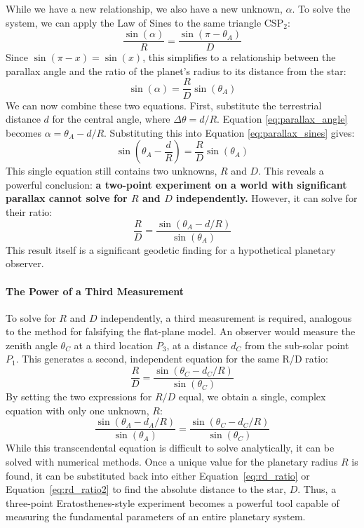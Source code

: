 \documentclass[11pt]{article}
\begin{document}
While we have a new relationship, we also have a new unknown, $\alpha$. To solve the system, we can apply the Law of Sines to the same triangle CSP$_2$:
\[
\frac{\sin(\alpha)}{R} = \frac{\sin(\pi - \theta_A)}{D}
\]
Since $\sin(\pi - x) = \sin(x)$, this simplifies to a relationship between the parallax angle and the ratio of the planet's radius to its distance from the star:
\begin{equation}
\sin(\alpha) = \frac{R}{D} \sin(\theta_A)
\label{eq:parallax_sines}
\end{equation}
We can now combine these two equations. First, substitute the terrestrial distance $d$ for the central angle, where $\Delta\theta = d/R$. Equation \ref{eq:parallax_angle} becomes $\alpha = \theta_A - d/R$. Substituting this into Equation \ref{eq:parallax_sines} gives:
\[
\sin\left(\theta_A - \frac{d}{R}\right) = \frac{R}{D} \sin(\theta_A)
\]
This single equation still contains two unknowns, $R$ and $D$. This reveals a powerful conclusion: \textbf{a two-point experiment on a world with significant parallax cannot solve for $R$ and $D$ independently.} However, it can solve for their ratio:
\begin{equation}
\frac{R}{D} = \frac{\sin(\theta_A - d/R)}{\sin(\theta_A)}
\label{eq:rd_ratio}
\end{equation}
This result itself is a significant geodetic finding for a hypothetical planetary observer.

\paragraph{The Power of a Third Measurement}
To solve for $R$ and $D$ independently, a third measurement is required, analogous to the method for falsifying the flat-plane model. An observer would measure the zenith angle $\theta_C$ at a third location $P_3$, at a distance $d_C$ from the sub-solar point $P_1$. This generates a second, independent equation for the same R/D ratio:
\begin{equation}
\frac{R}{D} = \frac{\sin(\theta_C - d_C/R)}{\sin(\theta_C)}
\label{eq:rd_ratio2}
\end{equation}
By setting the two expressions for $R/D$ equal, we obtain a single, complex equation with only one unknown, $R$:
\[
\frac{\sin(\theta_A - d_A/R)}{\sin(\theta_A)} = \frac{\sin(\theta_C - d_C/R)}{\sin(\theta_C)}
\]
While this transcendental equation is difficult to solve analytically, it can be solved with numerical methods. Once a unique value for the planetary radius $R$ is found, it can be substituted back into either Equation~\ref{eq:rd_ratio} or Equation~\ref{eq:rd_ratio2} to find the absolute distance to the star, $D$. Thus, a three-point Eratosthenes-style experiment becomes a powerful tool capable of measuring the fundamental parameters of an entire planetary system.
\end{document}
